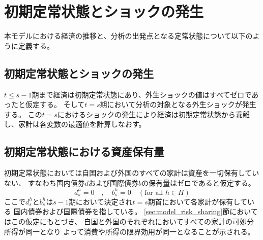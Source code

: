 
\section{初期定常状態とショックの発生}
\label{sec:model_steady_state}
本モデルにおける経済の推移と、分析の出発点となる定常状態について以下のように定義する。

\subsection{初期定常状態とショックの発生}
\label{sec:model_steady_state_initial_occurrence}
\(t\le s-1\)期まで経済は初期定常状態にあり、外生ショックの値はすべてゼロであったと仮定する。
そして\(t=s\)期において分析の対象となる外生ショックが発生する。
この\(t=s\)におけるショックの発生により経済は初期定常状態から乖離し、家計は各変数の最適値を計算しなおす。

\subsection{初期定常状態における資産保有量}
\label{sec:model_steady_state_assets_holding}
初期定常状態においては自国および外国のすべての家計は資産を一切保有していない、
すなわち国内債券\(d\)および国際債券\(b\)の保有量はゼロであると仮定する。
\begin{equation}
\label{form:model_steady_state_assets_holding_zero}
    d_s^h=0\quad,\quad b_s^h=0\quad(\text{for all }h\in H)
\end{equation}
ここで\(d_s^h\)と\(b_s^h\)は\(s-1\)期において決定され\(t=s\)期首において各家計が保有している
国内債券および国際債券を指している。
\ref{sec:model_risk_sharing}節においてはこの仮定にもとづき、
自国と外国のそれぞれにおいてすべての家計の可処分所得が同一となり
よって消費や所得の限界効用が同一となることが示される。